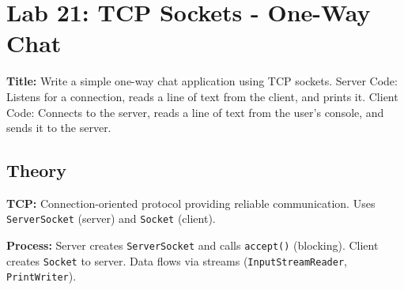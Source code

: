 \documentclass[10pt,a4paper]{article}
\begin{document}
\newpage
\section*{Lab 21: TCP Sockets - One-Way Chat}

\textbf{Title:} Write a simple one-way chat application using TCP sockets. Server Code: Listens for a connection, reads a line of text from the client, and prints it. Client Code: Connects to the server, reads a line of text from the user's console, and sends it to the server.

\subsection*{Theory}
\textbf{TCP:} Connection-oriented protocol providing reliable communication. Uses \texttt{ServerSocket} (server) and \texttt{Socket} (client).

\textbf{Process:} Server creates \texttt{ServerSocket} and calls \texttt{accept()} (blocking). Client creates \texttt{Socket} to server. Data flows via streams (\texttt{InputStreamReader}, \texttt{PrintWriter}).
\end{document}
